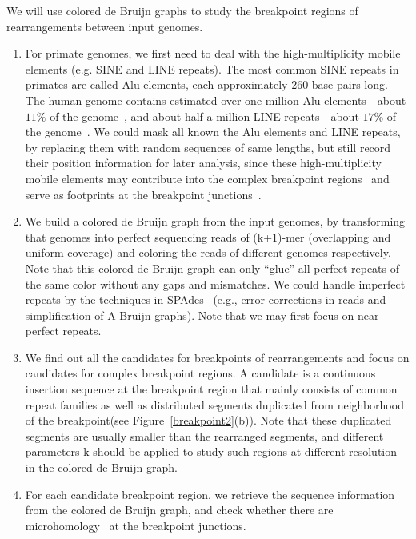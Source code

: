 \documentclass[12pt]{article}
\begin{document}
We will use colored de Bruijn graphs to study the breakpoint regions of rearrangements between input genomes.  
\begin{enumerate}
\item For primate genomes, we first need to deal with the high-multiplicity mobile elements (e.g. SINE and LINE repeats). 
 The most common SINE repeats in primates are called Alu elements, each approximately 260 base pairs long. 
 The human genome contains estimated over one million Alu elements---about $11\%$ of the genome~\cite{lander2001}, 
 and about half a million LINE repeats---about $17\%$ of the genome~\cite{cordaux2009}. 
 We could mask all known the Alu elements and LINE repeats, by replacing them with random sequences of same lengths, 
 but still record their position information for later analysis, since these high-multiplicity mobile elements may contribute into the complex breakpoint regions~\cite{girirajan2009} 
 and serve as footprints at the breakpoint junctions~\cite{carvalho2011inverted}.
 \item We build a colored de Bruijn graph from the input genomes, by transforming that genomes into perfect sequencing reads of (k+1)-mer (overlapping and uniform coverage) 
 and coloring the reads of different genomes respectively. Note that this colored de Bruijn graph can only ``glue'' all perfect repeats of the same color without any gaps and mismatches. 
 We could handle imperfect repeats by the techniques in SPAdes~\cite{spades} (e.g., error corrections in reads and simplification of A-Bruijn graphs). 
 Note that we may first focus on near-perfect repeats.
 \item We find out all the candidates for breakpoints of rearrangements  and focus on candidates for complex breakpoint regions.
 A candidate is a continuous insertion sequence at the breakpoint region 
 that mainly consists of common repeat families as well as distributed segments duplicated from neighborhood of the breakpoint(see Figure~\ref{breakpoint2}(b)).
 Note that these duplicated segments are usually smaller than the rearranged segments, 
 and different parameters k should be applied to study such regions at different resolution in the colored de Bruijn graph.
\item For each candidate breakpoint region, we retrieve the sequence information from the colored de Bruijn graph, 
and check whether there are microhomology~\cite{girirajan2009,hastings2009microhomology,liu2011chromosome} at the breakpoint junctions.
\end{enumerate}
\end{document}
